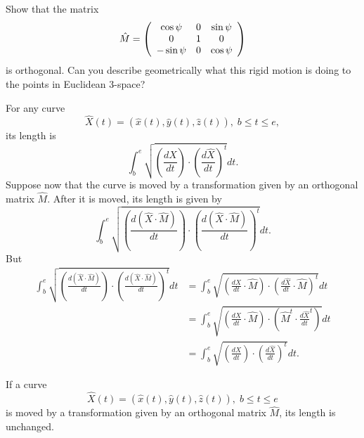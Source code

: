 \begin{exercise}
Show that the matrix%
\[
\hat{M}=\left(
\begin{array}
[c]{ccc}%
\cos\psi & 0 & \sin\psi\\
0 & 1 & 0\\
-\sin\psi & 0 & \cos\psi
\end{array}
\right)
\]
is orthogonal. Can you describe geometrically what this rigid motion is doing
to the points in Euclidean $3$-space?
\end{exercise}

For any curve%
\[
\hat{X}\left(  t\right)  =\left(  \hat{x}\left(  t\right)  ,\hat{y}\left(
t\right)  ,\hat{z}\left(  t\right)  \right)  ,\;b\leq t\leq e,
\]
its length is%
\[%
{\displaystyle\int\nolimits_{b}^{e}}
\sqrt{\left(  \frac{d\hat{X}}{dt}\right)  \cdot\left(  \frac{d\hat{X}}%
{dt}\right)  ^{t}}dt.
\]
Suppose now that the curve is moved by a transformation given by an orthogonal
matrix $\hat{M}$. After it is moved, its length is given by%
\[%
{\displaystyle\int\nolimits_{b}^{e}}
\sqrt{\left(  \frac{d\left(  \hat{X}\cdot\hat{M}\right)  }{dt}\right)
\cdot\left(  \frac{d\left(  \hat{X}\cdot\hat{M}\right)  }{dt}\right)  ^{t}%
}dt.
\]
But%
\begin{align*}%
{\displaystyle\int\nolimits_{b}^{e}}
\sqrt{\left(  \frac{d\left(  \hat{X}\cdot\hat{M}\right)  }{dt}\right)
\cdot\left(  \frac{d\left(  \hat{X}\cdot\hat{M}\right)  }{dt}\right)  ^{t}}dt
&  =%
{\displaystyle\int\nolimits_{b}^{e}}
\sqrt{\left(  \frac{d\hat{X}}{dt}\cdot\hat{M}\right)  \cdot\left(  \frac
{d\hat{X}}{dt}\cdot\hat{M}\right)  ^{t}}dt\\
&  =%
{\displaystyle\int\nolimits_{b}^{e}}
\sqrt{\left(  \frac{d\hat{X}}{dt}\cdot\hat{M}\right)  \cdot\left(  \hat{M}%
^{t}\cdot\frac{d\hat{X}}{dt}^{t}\right)  }dt\\
&  =%
{\displaystyle\int\nolimits_{b}^{e}}
\sqrt{\left(  \frac{d\hat{X}}{dt}\right)  \cdot\left(  \frac{d\hat{X}}%
{dt}\right)  ^{t}}dt.
\end{align*}


\begin{corollary}
If a curve
\[
\hat{X}\left(  t\right)  =\left(  \hat{x}\left(  t\right)  ,\hat{y}\left(
t\right)  ,\hat{z}\left(  t\right)  \right)  ,\;b\leq t\leq e
\]
is moved by a transformation given by an orthogonal matrix $\hat{M}$, its
length is unchanged.\pagebreak
\end{corollary}

